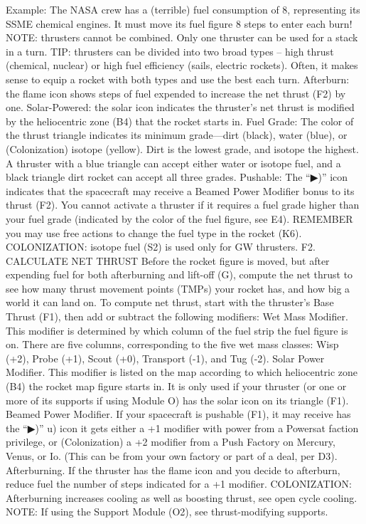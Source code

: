\documentclass[a4paper]{book}
\begin{document}
Example: The NASA crew has a (terrible) fuel consumption of 8, representing its SSME chemical engines. It must move its fuel figure 8 steps to enter each burn!
NOTE: thrusters cannot be combined. Only one thruster can be used for a stack in a turn.
TIP: thrusters can be divided into two broad types – high thrust (chemical, nuclear) or high fuel efficiency (sails, electric rockets). Often, it makes sense to equip a rocket with both types and use the best each turn.
Afterburn: the flame icon shows steps of fuel expended to increase the net thrust (F2) by one.
Solar-Powered: the solar icon indicates the thruster’s net thrust is modified by the heliocentric zone (B4) that the rocket starts in.
Fuel Grade: The color of the thrust triangle indicates its minimum grade—dirt (black), water (blue), or (Colonization) isotope (yellow). Dirt is the lowest grade, and isotope the highest. A thruster with a blue triangle can accept either water or isotope fuel, and a black triangle dirt rocket can accept all three grades.
Pushable: The “▶)” icon indicates that the spacecraft may receive a Beamed Power Modifier bonus to its thrust (F2).
You cannot activate a thruster if it requires a fuel grade higher than your fuel grade (indicated by the color of the fuel figure, see E4). REMEMBER you may use free actions to change the fuel type in the rocket (K6).
COLONIZATION: isotope fuel (S2) is used only for GW thrusters.
F2. CALCULATE NET THRUST
Before the rocket figure is moved, but after expending fuel for both afterburning and lift-off (G), compute the net thrust to see how many thrust movement points (TMPs) your rocket has, and how big a world it can land on. To compute net thrust, start with the thruster’s Base Thrust (F1), then add or subtract the following modifiers:
Wet Mass Modifier. This modifier is determined by which column of the fuel strip the fuel figure is on. There are five columns, corresponding to the five wet mass classes: Wisp (+2), Probe (+1), Scout (+0), Transport (-1), and Tug (-2).
Solar Power Modifier. This modifier is listed on the map according to which heliocentric zone (B4) the rocket map figure starts in. It is only used if your thruster (or one or more of its supports if using Module O) has the solar icon on its triangle (F1).
 Beamed Power Modifier. If your spacecraft is pushable (F1), it may receive has the “▶)” u) icon it gets either a +1 modifier with power from a Powersat faction privilege, or (Colonization) a +2 modifier from a Push Factory on Mercury, Venus, or Io. (This can be from your own factory or part of a deal, per D3).
Afterburning. If the thruster has the flame icon and you decide to afterburn, reduce fuel the number of steps indicated for a +1 modifier.
COLONIZATION: Afterburning increases cooling as well as boosting thrust, see open cycle cooling.
NOTE: If using the Support Module (O2), see thrust-modifying supports.
\end{document}
